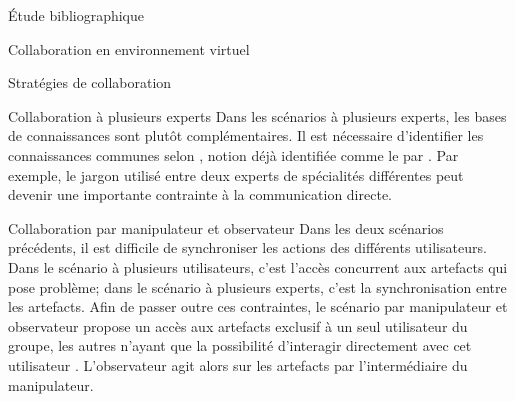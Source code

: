 \documentclass[myfrancais,ngerman,english,french]{mythesis}
\begin{document}
\begin{mychapter}{Étude bibliographique}
\begin{mysection}{Collaboration en environnement virtuel}
\begin{mysubsection}{Stratégies de collaboration}
\begin{mysubsubsection}{Collaboration à plusieurs experts}
					Dans les scénarios à plusieurs experts, les bases de connaissances sont plutôt complémentaires.
					Il est nécessaire d'identifier les connaissances communes selon , notion déjà identifiée comme le \mygrounding par  .
					Par exemple, le jargon utilisé entre deux experts de spécialités différentes peut devenir une importante contrainte à la communication directe.
				\end{mysubsubsection}
				\begin{mysubsubsection}{Collaboration par manipulateur et observateur}
					Dans les deux scénarios précédents, il est difficile de synchroniser les actions des différents utilisateurs.
					Dans le scénario à plusieurs utilisateurs, c'est l'accès concurrent aux artefacts qui pose problème; dans le scénario à plusieurs experts, c'est la synchronisation entre les artefacts.
					Afin de passer outre ces contraintes, le scénario par manipulateur et observateur propose un accès aux artefacts exclusif à un seul utilisateur du groupe, les autres n'ayant que la possibilité d'interagir directement avec cet utilisateur .
					L'observateur agit alors sur les artefacts par l'intermédiaire du manipulateur.


\end{mysubsubsection}
\end{mysubsection}
\end{mysection}
\end{mychapter}
\end{document}
